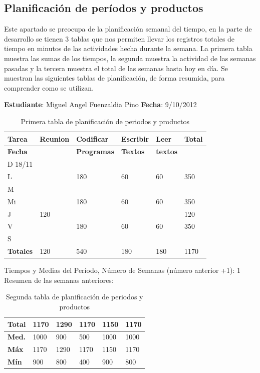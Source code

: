 \documentclass[a4paper,12pt,openany,oneside]{book}
\begin{document}
\subsection{Planificación de períodos y productos}
Este apartado se preocupa de la planificación semanal del tiempo, en la parte de desarrollo se tienen 3 tablas que nos permiten llevar los registros totales de tiempo en minutos de las actividades hecha durante la semana. La primera tabla muestra las sumas de los tiempos, la segunda muestra la actividad de las semanas pasadas y la tercera muestra el total de las semanas hasta hoy en día. Se muestran las siguientes tablas de planificación, de forma resumida, para comprender como se utilizan.

\begin{table}
\textbf{Estudiante}: Miguel Angel Fuenzaldia Pino     \textbf{Fecha}: 9/10/2012\\
\begin{tabular}{| l | l | l | l | l | l |}
\hline
\textbf{Tarea} & \textbf{Reunion} & \textbf{Codificar} & \textbf{Escribir} & \textbf{Leer} & \textbf{Total} \\
\hline
\textbf{Fecha} &                  & \textbf{Programas} & \textbf{Textos} & \textbf{textos} & \\
\hline
D 18/11 & & & & & \\
\hline
L & & 180 & 60 & 60 & 350\\
\hline
M & & & & & \\
\hline
Mi & & 180 & 60 & 60 & 350\\
\hline
J & 120 & & & & 120\\
\hline
V & & 180 & 60 & 60 & 350\\
\hline
S & & & & & \\
\hline
\textbf{Totales} & 120 & 540 & 180 & 180 & 1170\\
\hline
\end{tabular}
\caption{Primera tabla de planificación de periodos y productos}
\end{table}

Tiempos y Medias del Período, Número de Semanas (número anterior +1): 1\\
Resumen de las semanas anteriores:
\begin{table}
\begin{tabular}{| l | l | l | l | l | l |}
\hline
\textbf{Total} & 1170 & 1290 & 1170 & 1150 & 1170 \\
\hline
\textbf{Med.} & 1000 & 900 & 500 & 1000 & 1000 \\
\hline
\textbf{Máx} & 1170 & 1290 & 1170 & 1150 & 1170 \\
\hline
\textbf{Mín} & 900 & 800 & 400 & 900 & 800 \\
\hline
\end{tabular}
\caption{Segunda tabla de planificación de periodos y productos}
\end{table}
\end{document}
